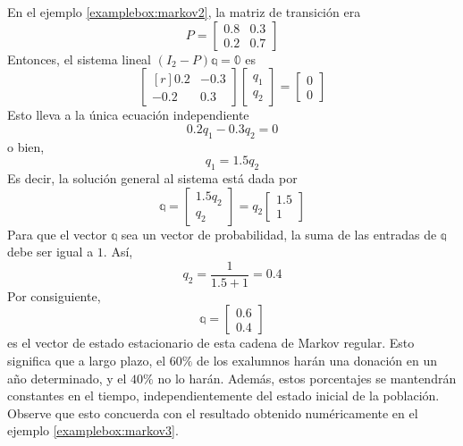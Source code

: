\begin{examplebox}{}{}
    En el ejemplo \ref{examplebox:markov2}, la matriz de transición era
    $$P = \begin{bmatrix} 
        0.8 & 0.3 \\ 
        0.2 & 0.7 
    \end{bmatrix}$$
    Entonces, el sistema lineal $(I_2 - P)\mathbb{q} = \mathbb{0}$ es
    $$\begin{bmatrix*}[r]
        0.2 & -0.3 \\
        -0.2 & 0.3
    \end{bmatrix*}\begin{bmatrix}
        q_1 \\
        q_2
    \end{bmatrix} = \begin{bmatrix}
        0 \\
        0
    \end{bmatrix}$$
    Esto lleva a la única ecuación independiente
    $$0.2q_1 - 0.3q_2 = 0$$
    o bien,
    $$q_1 = 1.5q_2$$
    Es decir, la solución general al sistema está dada por
    $$\mathbb{q} = \begin{bmatrix}
        1.5q_2 \\
        q_2
    \end{bmatrix} = q_2 \begin{bmatrix}
        1.5 \\
        1
    \end{bmatrix}$$
    Para que el vector $\mathbb{q}$ sea un vector de probabilidad, la suma de las entradas de $\mathbb{q}$ debe ser igual a $1$. Así,
    $$q_2 = \frac{1}{1.5 + 1} = 0.4$$
    Por consiguiente,
    $$\mathbb{q} = \begin{bmatrix}
        0.6 \\
        0.4
    \end{bmatrix}$$
    es el vector de estado estacionario de esta cadena de Markov regular. Esto significa que a largo plazo, el $60\%$ de los exalumnos harán una donación en un año determinado, y el $40\%$ no lo harán. Además, estos porcentajes se mantendrán constantes en el tiempo, independientemente del estado inicial de la población. Observe que esto concuerda con el resultado obtenido numéricamente en el ejemplo \ref{examplebox:markov3}.
\end{examplebox}

